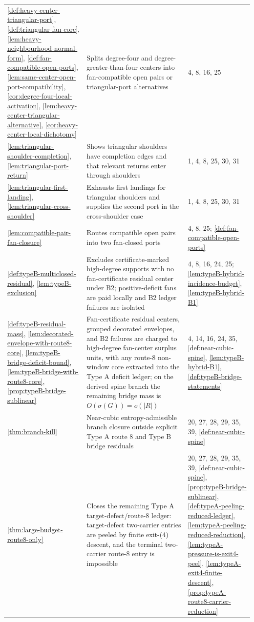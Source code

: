 \documentclass[11pt]{article}
\begin{document}
{\begin{longtable}{L{0.31\textwidth} L{0.42\textwidth} L{0.17\textwidth}}
\cref{def:heavy-center-triangular-port}, \cref{def:triangular-fan-core}, \cref{lem:heavy-neighbourhood-normal-form}, \cref{def:fan-compatible-open-ports}, \cref{lem:same-center-open-port-compatibility}, \cref{cor:degree-four-local-activation}, \cref{lem:heavy-center-triangular-alternative}, \cref{cor:heavy-center-local-dichotomy} & Splits degree-four and degree-greater-than-four centers into fan-compatible open pairs or triangular-port alternatives & 4, 8, 16, 25 \\
\cref{lem:triangular-shoulder-completion}, \cref{lem:triangular-port-return} & Shows triangular shoulders have completion edges and that relevant returns enter through shoulders & 1, 4, 8, 25, 30, 31 \\
\cref{lem:triangular-first-landing}, \cref{lem:triangular-cross-shoulder} & Exhausts first landings for triangular shoulders and supplies the second port in the cross-shoulder case & 1, 4, 8, 25, 30, 31 \\
\cref{lem:compatible-pair-fan-closure} & Routes compatible open pairs into two fan-closed ports & 4, 8, 25; \cref{def:fan-compatible-open-ports} \\
\cref{def:typeB-multiclosed-residual}, \cref{lem:typeB-exclusion} & Excludes certificate-marked high-degree supports with no fan-certificate residual center under B2; positive-deficit fans are paid locally and B2 ledger failures are isolated & 4, 8, 16, 24, 25; \cref{lem:typeB-hybrid-incidence-budget}, \cref{lem:typeB-hybrid-B1} \\
\cref{def:typeB-residual-mass}, \cref{lem:decorated-envelope-with-route8-core}, \cref{lem:typeB-bridge-deficit-bound}, \cref{lem:typeB-bridge-with-route8-core}, \cref{prop:typeB-bridge-sublinear} & Fan-certificate residual centers, grouped decorated envelopes, and B2 failures are charged to high-degree fan-center surplus units, with any route-8 non-window core extracted into the Type A deficit ledger; on the derived spine branch the remaining bridge mass is $O(\sigma(G))=o(|R|)$ & 4, 14, 16, 24, 35, \cref{def:near-cubic-spine}, \cref{lem:typeB-hybrid-B1}, \cref{def:typeB-bridge-statements} \\
\cref{thm:branch-kill} & Near-cubic entropy-admissible branch closure outside explicit Type A route 8 and Type B bridge residuals & 20, 27, 28, 29, 35, 39, \cref{def:near-cubic-spine} \\
\cref{thm:large-budget-route8-only} & Closes the remaining Type A target-defect/route-8 ledger: target-defect two-carrier entries are peeled by finite exit-\textup{(4)} descent, and the terminal two-carrier route-8 entry is impossible & 20, 27, 28, 29, 35, 39, \cref{def:near-cubic-spine}, \cref{prop:typeB-bridge-sublinear}, \cref{def:typeA-peeling-reduced-ledger}, \cref{lem:typeA-peeling-reduced-reduction}, \cref{lem:typeA-pressure-is-exit4-peel}, \cref{lem:typeA-exit4-finite-descent}, \cref{prop:typeA-route8-carrier-reduction} \\

\end{longtable}}
\end{document}
